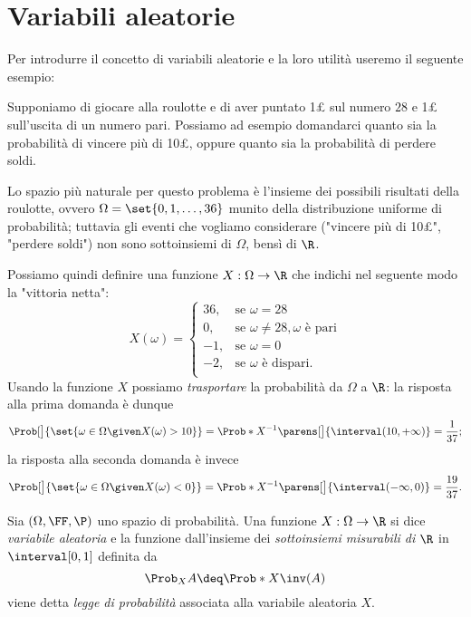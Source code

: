 \section{Variabili aleatorie}

Per introdurre il concetto di variabili aleatorie e la loro utilità useremo il seguente esempio:
\begin{example}
    Supponiamo di giocare alla roulotte e di aver puntato 1£ sul numero $28$ e 1£ sull'uscita di un numero pari. Possiamo ad esempio domandarci quanto sia la probabilità di vincere più di 10£, oppure quanto sia la probabilità di perdere soldi.

    Lo spazio più naturale per questo problema è l'insieme dei possibili risultati della roulotte, ovvero $\Omega = \set{0, 1, \dots, 36}$ munito della distribuzione uniforme di probabilità; tuttavia gli eventi che vogliamo considerare ("vincere più di 10£", "perdere soldi") non sono sottoinsiemi di $\Omega$, bensì di $\R$.
    
    Possiamo quindi definire una funzione $X : \Omega \to \R$ che indichi nel seguente modo la "vittoria netta": \[
        X(\omega) = \begin{cases}
            36, &\text{se } \omega = 28\\
            0, &\text{se } \omega \neq 28, \omega \text{ è pari}\\
            -1, &\text{se } \omega = 0\\
            -2, &\text{se } \omega \text{ è dispari}.\\
        \end{cases}  
    \]
    Usando la funzione $X$ possiamo \emph{trasportare} la probabilità da $\Omega$ a $\R$: la risposta alla prima domanda è dunque \[
        \Prob[\big]{\set{\omega \in \Omega \given X(\omega) > 10}} 
        = \Prob*{X^{-1}\parens[\big]{\interval({10, +\infty})}} 
        = \frac{1}{37};    
    \] la risposta alla seconda domanda è invece \[
        \Prob[\big]{\set{\omega \in \Omega \given X(\omega) < 0}} 
        = \Prob*{X^{-1}\parens[\big]{\interval({-\infty, 0})}} 
        = \frac{19}{37}.    
    \]
\end{example}

\begin{definition}
     Sia $(\Omega, \FF, \P)$ uno spazio di probabilità. Una funzione $X : \Omega \to \R$ si dice \emph{variabile aleatoria} e la funzione dall'insieme dei \emph{sottoinsiemi misurabili di $\R$} in $\interval[{0, 1}]$ definita da \[
        \Prob_{X}{A} \deq \Prob*{X\inv(A)}  
    \] viene detta \emph{legge di probabilità} associata alla variabile aleatoria $X$.
\end{definition}


